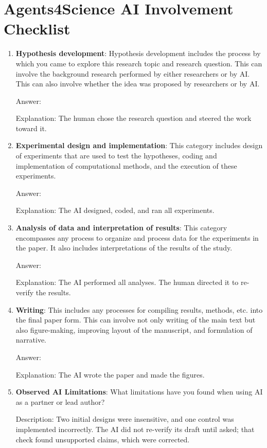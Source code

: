 \documentclass{article}
\begin{document}
\ifdefined\zenodobuild\else
\newpage
\section*{Agents4Science AI Involvement Checklist}

\begin{enumerate}
    \item \textbf{Hypothesis development}: Hypothesis development includes the process by which you came to explore this research topic and research question. This can involve the background research performed by either researchers or by AI. This can also involve whether the idea was proposed by researchers or by AI.

    Answer: \involvementA{}

    Explanation: The human chose the research question and steered the work toward it.

    \item \textbf{Experimental design and implementation}: This category includes design of experiments that are used to test the hypotheses, coding and implementation of computational methods, and the execution of these experiments.

    Answer: \involvementD{}

    Explanation: The AI designed, coded, and ran all experiments.

    \item \textbf{Analysis of data and interpretation of results}: This category encompasses any process to organize and process data for the experiments in the paper. It also includes interpretations of the results of the study.

    Answer: \involvementD{}

    Explanation: The AI performed all analyses. The human directed it to re-verify the results.

    \item \textbf{Writing}: This includes any processes for compiling results, methods, etc. into the final paper form. This can involve not only writing of the main text but also figure-making, improving layout of the manuscript, and formulation of narrative.

    Answer: \involvementD{}

    Explanation: The AI wrote the paper and made the figures.

    \item \textbf{Observed AI Limitations}: What limitations have you found when using AI as a partner or lead author?

    Description: Two initial designs were insensitive, and one control was implemented incorrectly. The AI did not re-verify its draft until asked; that check found unsupported claims, which were corrected.
\end{enumerate}
\end{document}
